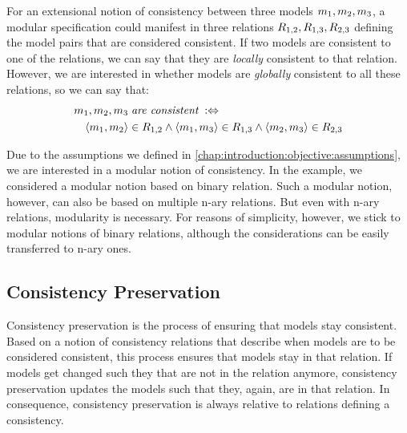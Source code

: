 For an extensional notion of consistency between three models $m_{1}, m_{2}, m_{3}$, a modular specification could manifest in three relations $R_{1,2}, R_{1,3}, R_{2,3}$ defining the model pairs that are considered consistent.
If two models are consistent to one of the relations, we can say that they are \emph{locally} consistent to that relation.
However, we are interested in whether models are \emph{globally} consistent to all these relations, so we can say that:
\begin{align*}
    & m_{1}, m_{2}, m_{3} \; \textit{are consistent} \; :\Leftrightarrow \\
    & \hspace{1em} 
    \langle m_{1},m_{2} \rangle \in R_{1,2} \land \langle m_{1},m_{3} \rangle \in R_{1,3} \land \langle m_{2},m_{3} \rangle \in R_{2,3}
\end{align*}

Due to the assumptions we defined in \autoref{chap:introduction:objective:assumptions}, we are interested in a modular notion of consistency.
In the example, we considered a modular notion based on binary relation. Such a modular notion, however, can also be based on multiple n-ary relations. 
But even with n-ary relations, modularity is necessary.
For reasons of simplicity, however, we stick to modular notions of binary relations, although the considerations can be easily transferred to n-ary ones.


\subsection{Consistency Preservation}

Consistency preservation is the process of ensuring that models stay consistent.
Based on a notion of \glspl{consistency relation} that describe when models are to be considered consistent, this process ensures that models stay in that relation. 
If models get changed such they that are not in the relation anymore, consistency preservation updates the models such that they, again, are in that relation.
In consequence, consistency preservation is always relative to relations defining a consistency.

